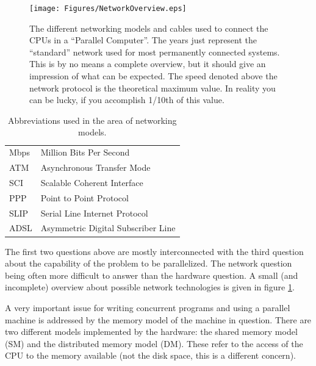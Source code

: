 \begin{figure}[htbp]
  \begin{center}
    \leavevmode
    \texttt{[image: Figures/NetworkOverview.eps]}
    \caption{The different networking models and cables used to connect
        the CPUs in a ``Parallel Computer''. The years just represent the
        ``standard'' network used for most permanently connected systems.
        This is by no means a complete overview, but it should give
        an impression of what can be expected. The speed denoted above
        the network protocol is the theoretical maximum value. In reality
        you can be lucky, if you accomplish 1/10th of this value.}
    \label{fig:NetworkOverview}
  \end{center}
\end{figure}
\begin{table}[htbp]
  \begin{center}
    \begin{tabular}{ll}
      Mbps & Million Bits Per Second \\
      ATM & Asynchronous Transfer Mode \\
      SCI & Scalable Coherent Interface \\
      PPP & Point to Point Protocol \\
      SLIP & Serial Line Internet Protocol \\
      ADSL & Asymmetric Digital Subscriber Line  \\      
    \end{tabular}
    \caption{Abbreviations used in the area of networking models.}
    \label{tab:NetworkingAbbrevs}
  \end{center}
\end{table}
The first two questions above are mostly interconnected with the
third question about the capability of the problem to be parallelized.
The network question being often more difficult to answer than the hardware
question. A small (and incomplete) overview about possible network  
technologies is given in figure \ref{fig:NetworkOverview}.

A very important issue for writing concurrent programs and using
a parallel machine is addressed by the memory model of the 
machine in question. There are two different models implemented
by the hardware: the shared memory model (SM) and the distributed
memory model (DM). These refer to the access of the CPU to the
memory available (not the disk space, this is a different concern).

